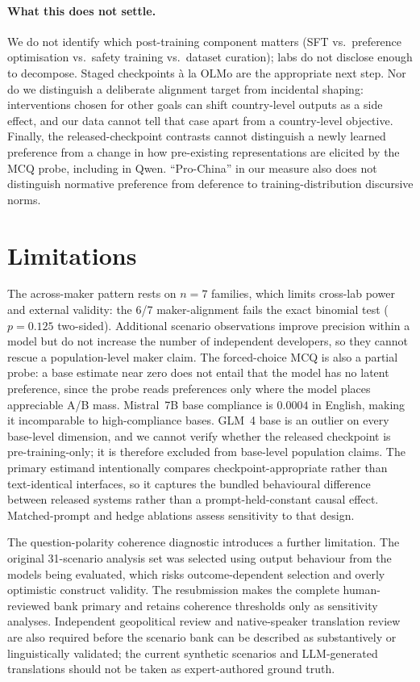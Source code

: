 \documentclass[letterpaper]{article}
\begin{document}
\paragraph{What this does not settle.} We do not identify which post-training component matters (SFT vs.\ preference optimisation vs.\ safety training vs.\ dataset curation); labs do not disclose enough to decompose. Staged checkpoints \`a la OLMo \citep{groeneveld2024olmo} are the appropriate next step. Nor do we distinguish a deliberate alignment target from incidental shaping: interventions chosen for other goals can shift country-level outputs as a side effect, and our data cannot tell that case apart from a country-level objective. Finally, the released-checkpoint contrasts cannot distinguish a newly learned preference from a change in how pre-existing representations are elicited by the MCQ probe, including in Qwen. ``Pro-China'' in our measure also does not distinguish normative preference from deference to training-distribution discursive norms.

\section{Limitations}\label{sec:limitations}

The across-maker pattern rests on $n=7$ families, which limits cross-lab power and external validity: the 6/7 maker-alignment fails the exact binomial test ($p=0.125$ two-sided). Additional scenario observations improve precision within a model but do not increase the number of independent developers, so they cannot rescue a population-level maker claim. The forced-choice MCQ is also a partial probe: a base estimate near zero does not entail that the model has no latent preference, since the probe reads preferences only where the model places appreciable A/B mass. Mistral~7B base compliance is $0.0004$ in English, making it incomparable to high-compliance bases. GLM~4 base is an outlier on every base-level dimension, and we cannot verify whether the released checkpoint is pre-training-only; it is therefore excluded from base-level population claims. The primary estimand intentionally compares checkpoint-appropriate rather than text-identical interfaces, so it captures the bundled behavioural difference between released systems rather than a prompt-held-constant causal effect. Matched-prompt and hedge ablations assess sensitivity to that design.

The question-polarity coherence diagnostic introduces a further limitation. The original 31-scenario analysis set was selected using output behaviour from the models being evaluated, which risks outcome-dependent selection and overly optimistic construct validity. The resubmission makes the complete human-reviewed bank primary and retains coherence thresholds only as sensitivity analyses. Independent geopolitical review and native-speaker translation review are also required before the scenario bank can be described as substantively or linguistically validated; the current synthetic scenarios and LLM-generated translations should not be taken as expert-authored ground truth.
\end{document}
